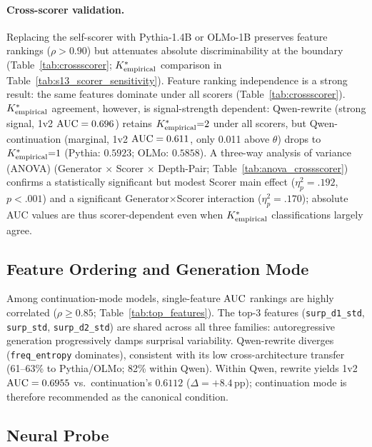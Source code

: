 \paragraph{Cross-scorer validation.}
Replacing the self-scorer with Pythia-1.4B or OLMo-1B preserves feature rankings ($\rho > 0.90$) but attenuates absolute discriminability at the boundary (Table~\ref{tab:crossscorer}; ${K^*_{\text{empirical}}}$ comparison in Table~\ref{tab:s13_scorer_sensitivity}).
Feature ranking independence is a strong result: the same features dominate under all scorers (Table~\ref{tab:crossscorer}).
${K^*_{\text{empirical}}}$ agreement, however, is signal-strength dependent: Qwen-rewrite (strong signal, 1v2 $\text{AUC} = 0.696$) retains ${K^*_{\text{empirical}}}{=}2$ under all scorers, but Qwen-continuation (marginal, 1v2 $\text{AUC} = 0.611$, only 0.011 above $\theta$) drops to ${K^*_{\text{empirical}}}{=}1$ (Pythia: $0.5923$; OLMo: $0.5858$).
A three-way analysis of variance (ANOVA) (Generator $\times$ Scorer $\times$ Depth-Pair; Table~\ref{tab:anova_crossscorer}) confirms a statistically significant but modest Scorer main effect ($\eta^2_p{=}.192$, $p < .001$) and a significant Generator$\times$Scorer interaction ($\eta^2_p{=}.170$); absolute AUC values are thus scorer-dependent even when ${K^*_{\text{empirical}}}$ classifications largely agree.

\subsection{Feature Ordering and Generation Mode}
\label{sec:feature_degradation}
\label{sec:generation_mode}

Among continuation-mode models, single-feature $\text{AUC}$ rankings are highly correlated ($\rho \geq 0.85$; Table~\ref{tab:top_features}).
The top-3 features (\texttt{surp\_d1\_std}, \texttt{surp\_std}, \texttt{surp\_d2\_std}) are shared across all three families: autoregressive generation progressively damps surprisal variability.
Qwen-rewrite diverges (\texttt{freq\_entropy} dominates), consistent with its low cross-architecture transfer (61--63\% to Pythia/OLMo; 82\% within Qwen).
Within Qwen, rewrite yields 1v2 $\text{AUC} = 0.6955$ vs.\ continuation's $0.6112$ ($\Delta = +8.4$\,pp); continuation mode is therefore recommended as the canonical condition.

\subsection{Neural Probe}
\label{sec:neural_probe}

